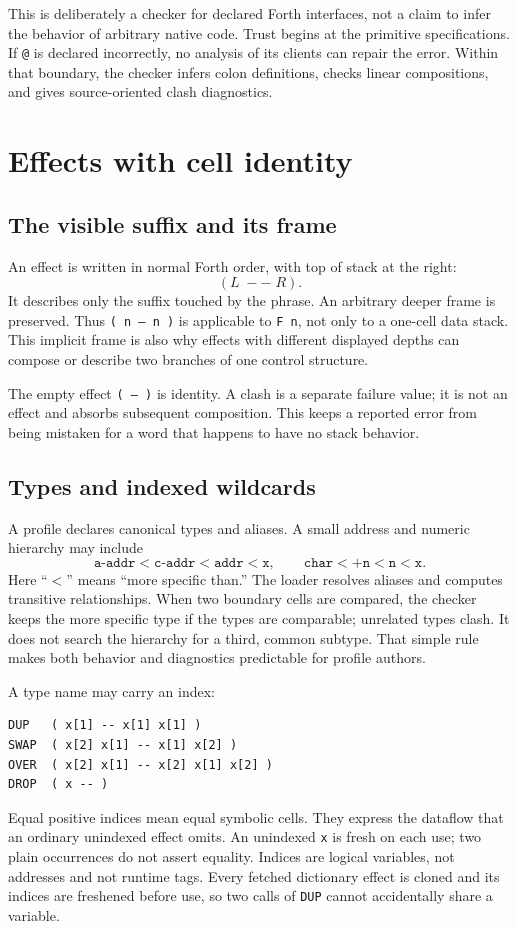 \documentclass[10pt,a4paper]{article}
\begin{document}
This is deliberately a checker for declared Forth interfaces, not a claim to
infer the behavior of arbitrary native code.  Trust begins at the primitive
specifications.  If \texttt{@} is declared incorrectly, no analysis of its
clients can repair the error.  Within that boundary, the checker infers colon
definitions, checks linear compositions, and gives source-oriented clash
diagnostics.

\section{Effects with cell identity}

\subsection{The visible suffix and its frame}

An effect is written in normal Forth order, with top of stack at the right:
\[
             (L\;--\;R).
\]
It describes only the suffix touched by the phrase.  An arbitrary deeper frame
is preserved.  Thus \texttt{( n -- n )} is applicable to \texttt{F n}, not
only to a one-cell data stack.  This implicit frame is also why effects with
different displayed depths can compose or describe two branches of one
control structure.

The empty effect \texttt{( -- )} is identity.  A clash is a separate failure
value; it is not an effect and absorbs subsequent composition.  This keeps a
reported error from being mistaken for a word that happens to have no stack
behavior.

\subsection{Types and indexed wildcards}

A profile declares canonical types and aliases.  A small address and numeric
hierarchy may include
\[
 \texttt{a-addr} < \texttt{c-addr} < \texttt{addr} < \texttt{x},
 \qquad
 \texttt{char} < \texttt{+n} < \texttt{n} < \texttt{x}.
\]
Here ``$<$'' means ``more specific than.''  The loader resolves aliases and
computes transitive relationships.  When two boundary cells are compared, the
checker keeps the more specific type if the types are comparable; unrelated
types clash.  It does not search the hierarchy for a third, common subtype.
That simple rule makes both behavior and diagnostics predictable for profile
authors.

A type name may carry an index:
\begin{lstlisting}
DUP   ( x[1] -- x[1] x[1] )
SWAP  ( x[2] x[1] -- x[1] x[2] )
OVER  ( x[2] x[1] -- x[2] x[1] x[2] )
DROP  ( x -- )
\end{lstlisting}
Equal positive indices mean equal symbolic cells.  They express the dataflow
that an ordinary unindexed effect omits.  An unindexed \texttt{x} is fresh on
each use; two plain occurrences do not assert equality.  Indices are logical
variables, not addresses and not runtime tags.  Every fetched dictionary
effect is cloned and its indices are freshened before use, so two calls of
\texttt{DUP} cannot accidentally share a variable.
\end{document}
